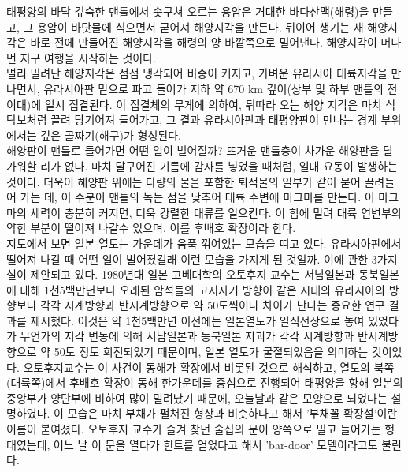 \documentclass[12pt,a4paper]{book}
\begin{document}
태평양의 바닥 깊숙한 맨틀에서 솟구쳐 오르는 용암은 거대한 바다산맥(해령)을 만들고, 
그 용암이 바닷물에 식으면서 굳어져 해양지각을 만든다. 
뒤이어 생기는 새 해양지각은 바로 전에 만들어진 해양지각을 해령의 양 바깥쪽으로 밀어낸다. 
해양지각이 머나먼 지구 여행을 시작하는 것이다. 
\\[-1.0em]

멀리 밀려난 해양지각은 점점 냉각되어 비중이 커지고, 가벼운 유라시아 대륙지각을 만나면서, 유라시아판 밑으로 파고 들어가 지하 약 670 km 깊이(상부 및 하부 맨틀의 전이대)에 일시 집결된다. 이 집결체의 무게에 의하여, 뒤따라 오는 해양 지각은 마치 식탁보처럼 끌려 당기어져 들어가고, 그 결과 유라시아판과 태평양판이 만나는 경계 부위에서는 깊은 골짜기(해구)가 형성된다. 
\\[-1.0em]

해양판이 맨틀로 들어가면 어떤 일이 벌어질까? 뜨거운 맨틀층이 차가운 해양판을 달가워할 리가 없다. 마치 달구어진 기름에 감자를 넣었을 때처럼, 일대 요동이 발생하는 것이다. 더욱이 해양판 위에는 다량의 물을 포함한 퇴적물의 일부가 같이 묻어 끌려들어 가는 데, 이 수분이 맨틀의 녹는 점을 낮추어 대륙 주변에 마그마를 만든다. 이 마그마의 세력이 충분히 커지면, 더욱 강렬한 대류를 일으킨다. 이 힘에 밀려 대륙 연변부의 약한 부분이 떨어져 나갈수 있으며, 이를 후배호 확장이라 한다.
\\[-1.0em]

지도에서 보면 일본 열도는 가운데가 움푹 꺾여있는 모습을 띠고 있다. 유라시아판에서 떨어져 나갈 때 어떤 일이 벌어졌길래 이런 모습을 가지게 된 것일까. 이에 관한 3가지설이 제안되고 있다.
1980년대 일본 고베대학의 오토후지 교수는 서남일본과 동북일본에 대해 1천5백만년보다 오래된 암석들의 고지자기 방향이 같은 시대의 유라시아의 방향보다 각각 시계방향과 반시계방향으로 약 50도씩이나 차이가 난다는 중요한 연구 결과를 제시했다. 이것은 약 1천5백만년 이전에는 일본열도가 일직선상으로 놓여 있었다가 무언가의 지각 변동에 의해 서남일본과 동북일본 지괴가 각각 시계방향과 반시계방향으로 약 50도 정도 회전되었기 때문이며, 일본 열도가 굴절되었음을 의미하는 것이었다. 오토후지교수는 이 사건이 동해가 확장에서 비롯된 것으로 해석하고, 열도의 북쪽(대륙쪽)에서 후배호 확장이 동해 한가운데를 중심으로 진행되어 태평양을 향해 일본의 중앙부가 양단부에 비하여 많이 밀려났기 때문에, 오늘날과 같은 모양으로 되었다는 설명하였다. 이 모습은 마치 부채가 펼쳐진 형상과 비슷하다고 해서 '부채꼴 확장설'이란 이름이 붙여졌다. 오토후지 교수가 즐겨 찾던 술집의 문이 양쪽으로 밀고 들어가는 형태였는데, 어느 날 이 문을 열다가 힌트를 얻었다고 해서 'bar-door' 모델이라고도 불린다.
\\[-1.0em]
\end{document}
